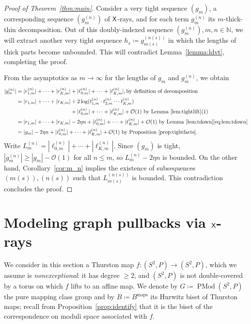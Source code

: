 \documentclass{amsart}
\newcommand\N{{\mathbb{N}}}
\newcommand\Mod{{\operatorname{PMod}}}
\theoremstyle{definition}
\theoremstyle{remark}
\newcommand{\sfX}{{\sf X}}
\begin{document}
\begin{proof}[Proof of Theorem~\ref{thm:main}]
Consider a very tight sequence $(g_m)$, a corresponding sequence  $(g_m^{(n)})$ of $\sfX$-rays, and for each term $g_m^{(n)}$ its $m$-thick-thin decomposition.  Out of this doubly-indexed sequence $(g_m^{(n)}), m, n\in \N$, we will extract another very tight sequence $h_s\coloneqq g_{m(s)}^{(n(s))}$ in which the lengths of thick parts become unbounded.  This will contradict Lemma~\ref{lemma:ldvt}, completing the proof.

From the asymptotics as $m \to \infty$ for the lengths of $g_m$ and $g_m^{(n)}$, we obtain
\begin{align*}
  |g_m^{(n)}| &= |r_{1,m}^{(n)}|+\cdots+|r_{K,m}^{(n)}| + |\ell_{0,m}^{(n)}|+\cdots+|\ell_{K,m}^{(n)}|, \text{by definition of decomposition}\\
        &= \begin{aligned}[t]
             |r_{1,m}|+\cdots+|r_{K,m}|&+2\log(t^{(n)}_{1,m}\cdot t^{(n)}_{2,m}\cdots t^{(n)}_{K,m})\\
             &+ |\ell_{0,m}^{(n)}|+\cdots+|\ell_{K,m}^{(n)}| + \mathcal O(1)\text{ by~Lemma~\ref{lem:tightlift}(1)}
           \end{aligned}\\
              &= |r_{1,m}|+\cdots+|r_{K,m}|-2\eta n+|\ell_{0,m}^{(n)}|+\cdots+|\ell_{K,m}^{(n)}| + \mathcal O(1)\text{ by Lemma~\ref{lem:tdown}\eqref{eq:lem:tdown}}\\
              &= |g_m|-2\eta n+|\ell_{0,m}^{(n)}|+\cdots+|\ell_{K,m}^{(n)}| + \mathcal O(1)\text{ by Proposition~\ref{prop:tightfacts}}.
\end{align*}
Write $L_m^{(n)}=|\ell_{0,m}^{(n)}|+\cdots+|\ell_{K,m}^{(n)}|$. Since $(g_m)$ is tight, $|g_m^{(n)}|\ge|g_m|-\mathcal O(1)$ for all $n\le m$, so $L_m^{(n)}-2\eta n$ is bounded. On the other hand, Corollary~\ref{cor:m_n} implies the existence of subsequences $(m(s)),(n(s))$ such that $L_{m(s)}^{(n(s))}$ is bounded. This contradiction concludes the proof.
\end{proof}

\section{Modeling graph pullbacks via $\sfX$-rays}\label{ss:gga}
We consider in this section a Thurston map $f\colon(S^2,P)\to (S^2, P)$, which we assume is \emph{nonexceptional}: it has degree $\ge2$, and $(S^2,P)$ is not double-covered by a torus on which $f$ lifts to an affine map.  We denote by $G\coloneqq\Mod(S^2,P)$ the pure mapping class group and by $B\coloneqq B^{\text{maps}}$ its Hurwitz biset of Thurston maps; recall from Proposition~\ref{prop:identify} that it is the biset of the correspondence on moduli space associated with $f$.
\end{document}
